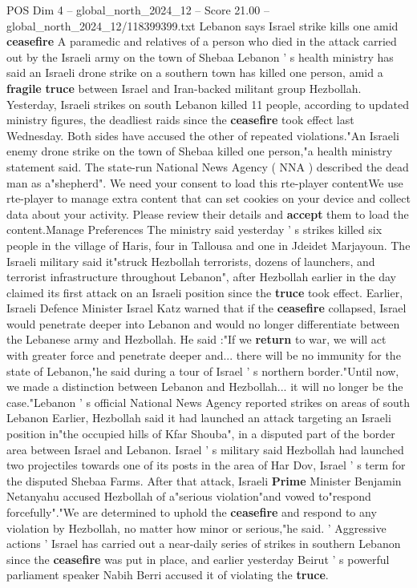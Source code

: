 \begin{textsample}{POS Dim 4 – global\_north\_2024\_12 – Score 21.00 – global\_north\_2024\_12/118399399.txt}  \label{ex:f4_pos_310}
Lebanon says Israel strike kills one amid \textbf{ceasefire} A paramedic and relatives of a person who died in the attack carried out by the Israeli army on the town of Shebaa Lebanon ' s health ministry has said an Israeli drone strike on a southern town has killed one person, amid a \textbf{fragile} \textbf{truce} between Israel and Iran-backed militant group Hezbollah.
Yesterday, Israeli strikes on south Lebanon killed 11 people, according to updated ministry figures, the deadliest raids since the \textbf{ceasefire} took effect last Wednesday.
Both sides have accused the other of repeated violations."An Israeli enemy drone strike on the town of Shebaa killed one person,"a health ministry statement said.
The state-run National News Agency ( NNA ) described the dead man as a"shepherd".
We need your consent to load this rte-player contentWe use rte-player to manage extra content that can set cookies on your device and collect data about your activity.
Please review their details and \textbf{accept} them to load the content.Manage Preferences The ministry said yesterday ' s strikes killed six people in the village of Haris, four in Tallousa and one in Jdeidet Marjayoun.
The Israeli military said it"struck Hezbollah terrorists, dozens of launchers, and terrorist infrastructure throughout Lebanon", after Hezbollah earlier in the day claimed its first attack on an Israeli position since the \textbf{truce} took effect.
Earlier, Israeli Defence Minister Israel Katz warned that if the \textbf{ceasefire} collapsed, Israel would penetrate deeper into Lebanon and would no longer differentiate between the Lebanese army and Hezbollah.
He said :"If we \textbf{return} to war, we will act with greater force and penetrate deeper and... there will be no immunity for the state of Lebanon,"he said during a tour of Israel ' s northern border."Until now, we made a distinction between Lebanon and Hezbollah... it will no longer be the case."Lebanon ' s official National News Agency reported strikes on areas of south Lebanon Earlier, Hezbollah said it had launched an attack targeting an Israeli position in"the occupied hills of Kfar Shouba", in a disputed part of the border area between Israel and Lebanon.
Israel ' s military said Hezbollah had launched two projectiles towards one of its posts in the area of Har Dov, Israel ' s term for the disputed Shebaa Farms.
After that attack, Israeli \textbf{Prime} Minister Benjamin Netanyahu accused Hezbollah of a"serious violation"and vowed to"respond forcefully"."We are determined to uphold the \textbf{ceasefire} and respond to any violation by Hezbollah, no matter how minor or serious,"he said. ' Aggressive actions ' Israel has carried out a near-daily series of strikes in southern Lebanon since the \textbf{ceasefire} was put in place, and earlier yesterday Beirut ' s powerful parliament speaker Nabih Berri accused it of violating the \textbf{truce}.

\end{textsample}
